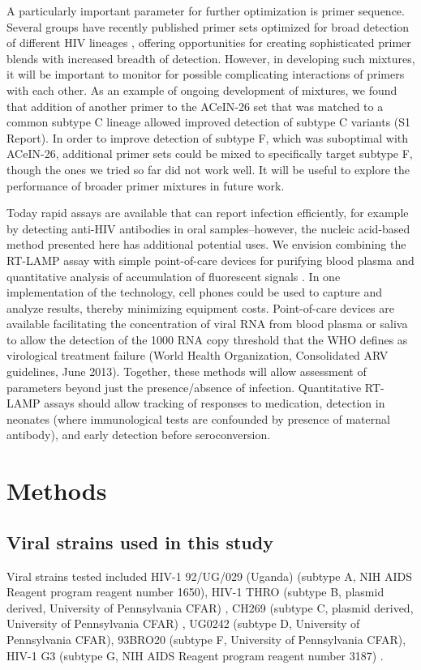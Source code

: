 \documentclass[../sherrill-Mix_thesis.tex]{subfiles}
\begin{document}
	A particularly important parameter for further optimization is primer sequence. Several groups have recently published primer sets optimized for broad detection of different HIV lineages \citep{Zeng2014,Hosaka2009}, offering opportunities for creating sophisticated primer blends with increased breadth of detection. However, in developing such mixtures, it will be important to monitor for possible complicating interactions of primers with each other. As an example of ongoing development of mixtures, we found that addition of another primer to the ACeIN-26 set that was matched to a common subtype C lineage allowed improved detection of subtype C variants (S1 Report). In order to improve detection of subtype F, which was suboptimal with ACeIN-26, additional primer sets could be mixed to specifically target subtype F, though the ones we tried so far did not work well. It will be useful to explore the performance of broader primer mixtures in future work.

	Today rapid assays are available that can report infection efficiently, for example by detecting anti-HIV antibodies in oral samples--however, the nucleic acid-based method presented here has additional potential uses. We envision combining the RT-LAMP assay with simple point-of-care devices for purifying blood plasma \citep{Liu2013} and quantitative analysis of accumulation of fluorescent signals \citep{Liu2011}. In one implementation of the technology, cell phones could be used to capture and analyze results, thereby minimizing equipment costs. Point-of-care devices are available facilitating the concentration of viral RNA from blood plasma or saliva \citep{Liu2011} to allow the detection of the 1000 RNA copy threshold that the WHO defines as virological treatment failure (World Health Organization, Consolidated ARV guidelines, June 2013). Together, these methods will allow assessment of parameters beyond just the presence/absence of infection. Quantitative RT-LAMP assays should allow tracking of responses to medication, detection in neonates (where immunological tests are confounded by presence of maternal antibody), and early detection before seroconversion.

\section{Methods}
	\subsection{Viral strains used in this study}
	Viral strains tested included HIV-1 92/UG/029 (Uganda) (subtype A, NIH AIDS Reagent program reagent number 1650), HIV-1 THRO (subtype B, plasmid derived, University of Pennsylvania CFAR) \citep{Parrish2013}, CH269 (subtype C, plasmid derived, University of Pennsylvania CFAR) \citep{Parrish2013}, UG0242 (subtype D, University of Pennsylvania CFAR), 93BRO20 (subtype F, University of Pennsylvania CFAR), HIV-1 G3 (subtype G, NIH AIDS Reagent program reagent number 3187) \citep{Abimiku1994}.
\end{document}
